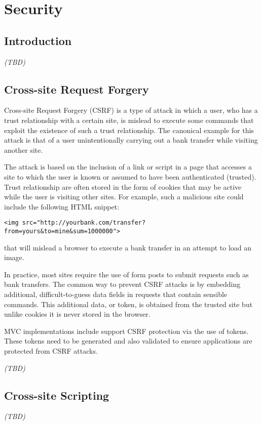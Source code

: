 \chapter{Security}

\section{Introduction}

{\em (TBD)}

\section{Cross-site Request Forgery}

Cross-site Request Forgery (CSRF) is a type of attack in which a user, who has a trust
relationship with a certain site, is mislead to execute some commands that exploit the
existence of such a trust relationship. The canonical example for this attack is that of
a user unintentionally carrying out a bank transfer while visiting another site. 

The attack is based on the inclusion of a link or script in a page that accesses a site 
to which the user is known or assumed to have been authenticated (trusted). Trust
relationship are often stored in the form of cookies that may be active while the user
is visiting other sites. For example, such a malicious site could include the following
HTML snippet:

\begin{verbatim}
<img src="http://yourbank.com/transfer?from=yours&to=mine&sum=1000000">
\end{verbatim}

that will mislead a browser to execute a bank transfer in an attempt to load an image.

In practice, most sites require the use of form posts to submit requests such as bank
transfers. The common way to prevent CSRF attacks is by embedding additional, 
difficult-to-guess data fields in requests that contain sensible commands. This 
additional data, or token, is obtained from the trusted site but unlike cookies it is
never stored in the browser.

MVC implementations include support CSRF protection via the use of tokens.
These tokens need to be generated and also validated to ensure applications
are protected from CSRF attacks.

{\em (TBD)}

\section{Cross-site Scripting}

{\em (TBD)}

